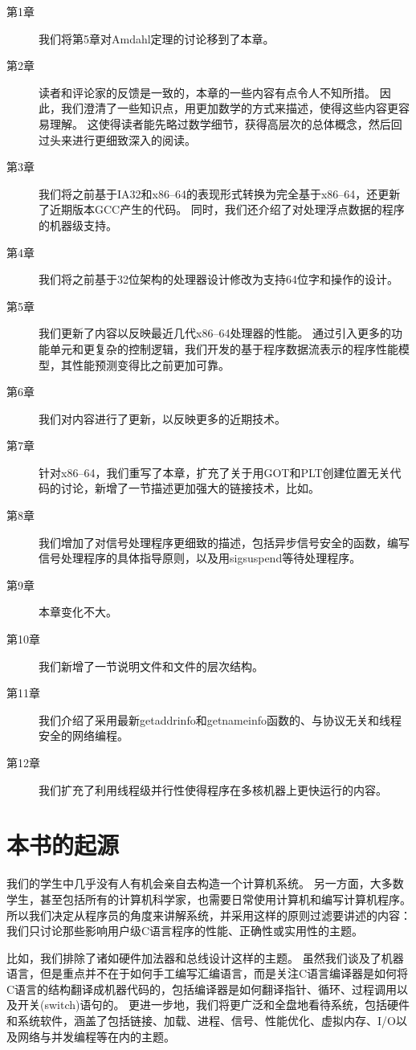 {{        \begin{description}
            \item[第1章] 我们将第5章对Amdahl定理的讨论移到了本章。
            \item[第2章]
            {
                读者和评论家的反馈是一致的，本章的一些内容有点令人不知所措。
                因此，我们澄清了一些知识点，用更加数学的方式来描述，使得这些内容更容易理解。
                这使得读者能先略过数学细节，获得高层次的总体概念，然后回过头来进行更细致深入的阅读。
            }
            \item[第3章]
            {
                我们将之前基于IA32和x86--64的表现形式转换为完全基于x86--64，还更新了近期版本GCC产生的代码。
                同时，我们还介绍了对处理浮点数据的程序的机器级支持。
            }
            \item[第4章] 我们将之前基于32位架构的处理器设计修改为支持64位字和操作的设计。
            \item[第5章]
            {
                我们更新了内容以反映最近几代x86--64处理器的性能。
                通过引入更多的功能单元和更复杂的控制逻辑，我们开发的基于程序数据流表示的程序性能模型，其性能预测变得比之前更加可靠。
            }
            \item[第6章] 我们对内容进行了更新，以反映更多的近期技术。
            \item[第7章] 针对x86--64，我们重写了本章，扩充了关于用GOT和PLT创建位置无关代码的讨论，新增了一节描述更加强大的链接技术，比如。
            \item[第8章] 我们增加了对信号处理程序更细致的描述，包括异步信号安全的函数，编写信号处理程序的具体指导原则，以及用sigsuspend等待处理程序。
            \item[第9章] 本章变化不大。
            \item[第10章] 我们新增了一节说明文件和文件的层次结构。
            \item[第11章] 我们介绍了采用最新getaddrinfo和getnameinfo函数的、与协议无关和线程安全的网络编程。
            \item[第12章] 我们扩充了利用线程级并行性使得程序在多核机器上更快运行的内容。
        \end{description}
    }

    \section{本书的起源}
    {
        我们的学生中几乎没有人有机会亲自去构造一个计算机系统。
        另一方面，大多数学生，甚至包括所有的计算机科学家，也需要日常使用计算机和编写计算机程序。
        所以我们决定从程序员的角度来讲解系统，并采用这样的原则过滤要讲述的内容：
        我们只讨论那些影响用户级C语言程序的性能、正确性或实用性的主题。

        比如，我们排除了诸如硬件加法器和总线设计这样的主题。
        虽然我们谈及了机器语言，但是重点并不在于如何手工编写汇编语言，而是关注C语言编译器是如何将C语言的结构翻译成机器代码的，包括编译器是如何翻译指针、循环、过程调用以及开关(switch)语句的。
        更进一步地，我们将更广泛和全盘地看待系统，包括硬件和系统软件，涵盖了包括链接、加载、进程、信号、性能优化、虚拟内存、I/O以及网络与并发编程等在内的主题。
    }
}

\cleardoublepage

\endinput
